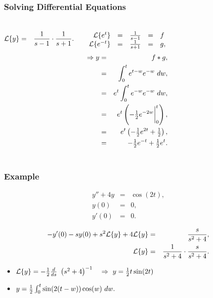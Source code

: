 \begin{frame}
  \frametitle{Solving Differential Equations}

  \begin{columns}
    \begin{eqnarray*}
      \laplace{y} & = & \frac{1}{s-1}\cdot\frac{1}{s+1}.
    \end{eqnarray*}

    {
      \begin{eqnarray*}
        \begin{array}{rclcl}
          \laplace{e^t}   & = & \frac{1}{s-1} & = & f  \\
          \laplace{e^{-t}} & = & \frac{1}{s+1} & = & g,
        \end{array}
      \end{eqnarray*}
    }
    {
      \begin{eqnarray*}
        \Rightarrow y & = & f*g, \\
        & = & \int^t_0 e^{t-w} e^{-w} ~ dw, \\
        & = & e^{t} \int^t_0 e^{-w} e^{-w} ~ dw, \\
        & = & e^t \left( -\mbox{$\frac{1}{2}$} e^{-2w} \bigg|^t_0 \right), \\
        & = & e^t \left( -\mbox{$\frac{1}{2}$} e^{2t} + \mbox{$\frac{1}{2}$} \right), \\
        & = & -\mbox{$\frac{1}{2}$} e^{-t} + \mbox{$\frac{1}{2}$} e^{t}.
      \end{eqnarray*}
    }

    
  \end{columns}


\end{frame}


\begin{frame}
  \frametitle{Example}

  \begin{eqnarray*}
    y''+4y & = & \cos(2t), \\
    y(0) & = & 0, \\
    y'(0) & = & 0.
  \end{eqnarray*}

  {
    \begin{eqnarray*}
      -y'(0) - sy(0) + s^2 \laplace{y} + 4 \laplace{y} & = & \frac{s}{s^2+4}, \\
      \laplace{y} & = & \frac{1}{s^2+4} \cdot \frac{s}{s^2+4}.
    \end{eqnarray*}
  }

  {
    \begin{itemize}
    \item $\laplace{y} =  -\half \deriv{~}{s} \lp s^2+4 \rp^{-1}$ ~
      $\Rightarrow~y=\mbox{$\frac{1}{2}$} t \sin(2t)$
    \item $y=\mbox{$\frac{1}{2}$}\int^t_0 \sin(2(t-w))\cos(w)~dw.$
    \end{itemize}
  }

\end{frame}



